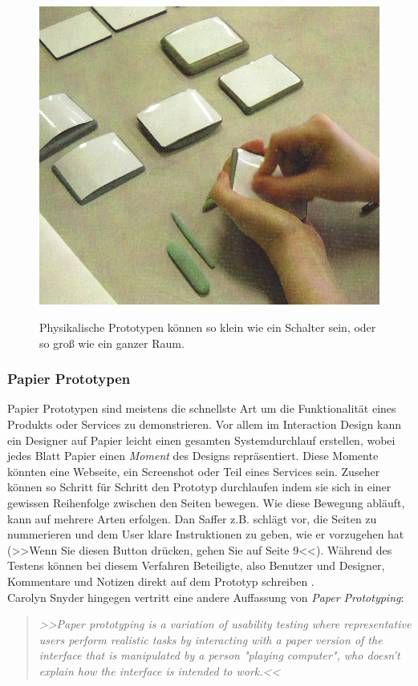\begin{figure}
	\begin{center}
        {\includegraphics[width=.8\linewidth]{gfx/safferPhysicalPrototype}}
	\end{center}
		\caption[Physikalische Prototypen. \newline \citep{Saffer:2007}]{Physikalische Prototypen können so klein wie ein Schalter sein, oder so groß wie ein ganzer Raum.}\label{fig:safferPhysicalPrototype}
\end{figure}

\subsubsection{Papier Prototypen} 
Papier Prototypen sind meistens die schnellste Art um die Funktionalität eines Produkts oder Services zu demonstrieren. Vor allem im Interaction Design kann ein Designer auf Papier leicht einen gesamten Systemdurchlauf erstellen, wobei jedes Blatt Papier einen \emph{Moment} des Designs repräsentiert. Diese Momente könnten eine Webseite, ein Screenshot oder Teil eines Services sein. Zuseher können so Schritt für Schritt den Prototyp durchlaufen indem sie sich in einer gewissen Reihenfolge zwischen den Seiten bewegen.
Wie diese Bewegung abläuft, kann auf mehrere Arten erfolgen. Dan Saffer z.B. schlägt vor, die Seiten zu nummerieren und dem User klare Instruktionen zu geben, wie er vorzugehen hat (>>Wenn Sie diesen Button drücken, gehen Sie auf Seite 9<<). Während des Testens können bei diesem Verfahren Beteiligte, also Benutzer und Designer, Kommentare und Notizen direkt auf dem Prototyp schreiben \citep{Saffer:2007}.\\
Carolyn Snyder hingegen vertritt eine andere Auffassung von \emph{Paper Prototyping}: 
\newpage
\begin{quote}
	\textsl{>>Paper prototyping is a variation of usability testing where representative users perform realistic tasks by interacting with a paper version of the interface that is manipulated by a person "playing computer", who doesn't explain how the interface is intended to work.<<}
\begin{flushright}\citep{Snyder:2003}\end{flushright}
\end{quote}

